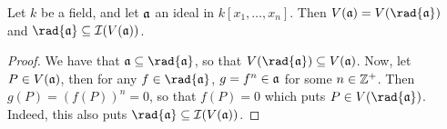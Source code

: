 \begin{proposition}\label{proposition_10.2.3}
  Let $k$ be a field, and let $\mathfrak{a}$ an ideal in $k[x_1, \dots, x_n]$.
  Then $V(\af)=V(\rad{\af})$ and $\rad{\af} \subseteq \Ic(V(\af))$.
\end{proposition}
\begin{proof}
  We have that $\af \subseteq \rad{\af}$, so that $V(\rad{\af})
  \subseteq V(\af)$.  Now, let $P \in V(\mathfrak{a})$, then for any $f \in
  \rad{\af}$, $g=f^n \in \mathfrak{a}$ for some $n \in \mathbb{Z}^+$. Then
  $g(P)=(f(P))^n=0$, so that $f(P)=0$ which puts
  $P \in V(\rad{\af})$. Indeed, this also puts $\rad{\af}
  \subseteq \Ic(V(\af))$.
\end{proof}
